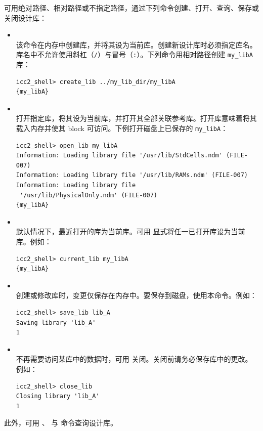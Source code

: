 可用绝对路径、相对路径或不指定路径，通过下列命令创建、打开、查询、保存或关闭设计库：
\begin{itemize}
  \item {}\\
    该命令在内存中创建库，并将其设为当前库。创建新设计库时必须指定库名。库名中不允许使用斜杠（\texttt{/}）与冒号（\texttt{:}）。下列命令用相对路径创建 \texttt{my\_libA} 库：
\begin{lstlisting}
icc2_shell> create_lib ../my_lib_dir/my_libA
{my_libA}
\end{lstlisting}

  \item {}\\
    打开指定库，将其设为当前库，并打开其全部关联参考库。打开库意味着将其载入内存并使其 block 可访问。下例打开磁盘上已保存的 \texttt{my\_libA}：
\begin{lstlisting}
icc2_shell> open_lib my_libA
Information: Loading library file '/usr/lib/StdCells.ndm' (FILE-007)
Information: Loading library file '/usr/lib/RAMs.ndm' (FILE-007)
Information: Loading library file
 '/usr/lib/PhysicalOnly.ndm' (FILE-007)
{my_libA}
\end{lstlisting}

  \item {}\\
    默认情况下，最近打开的库为当前库。可用  显式将任一已打开库设为当前库。例如：
\begin{lstlisting}
icc2_shell> current_lib my_libA
{my_libA}
\end{lstlisting}

  \item {}\\
    创建或修改库时，变更仅保存在内存中。要保存到磁盘，使用本命令。例如：
\begin{lstlisting}
icc2_shell> save_lib lib_A
Saving library 'lib_A'
1
\end{lstlisting}

  \item {}\\
    不再需要访问某库中的数据时，可用  关闭。关闭前请务必保存库中的更改。例如：
\begin{lstlisting}
icc2_shell> close_lib
Closing library 'lib_A'
1
\end{lstlisting}
\end{itemize}

此外，可用 、 与  命令查询设计库。

